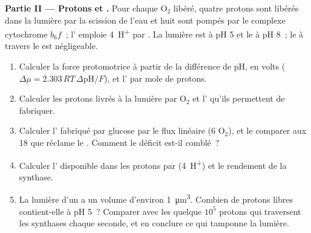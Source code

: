 \begin{problem}
\medskip
\noindent\textbf{Partie II --- Protons et .}
Pour chaque $\mathrm{O_2}$ libéré, quatre protons sont libérés dans la
lumière par la scission de l'eau et huit sont pompés par le complexe
cytochrome $b_6f$~; l' emploie \qty{4}{H^+} par . La
lumière est à pH 5 et le  à pH 8~; le  à
travers le  est négligeable.
\begin{enumerate}[resume]
  \item Calculer la force protomotrice à partir de la différence de pH,
        en volts ($\Delta\mu = 2.303\,RT\,\Delta\mathrm{pH}/F$), et
        l' par mole de protons.
  \item Calculer les protons livrés à la lumière par $\mathrm{O_2}$ et
        l' qu'ils permettent de fabriquer.
  \item Calculer l' fabriqué par glucose par le flux linéaire (6
        $\mathrm{O_2}$), et le comparer aux 18 que réclame le . Comment le déficit est-il comblé~?
  \item Calculer l' disponible dans les protons par 
        (\qty{4}{H^+}) et le rendement de la synthase.
  \item La lumière d'un  a un volume d'environ
        \qty{1}{\micro m^3}. Combien de protons libres contient-elle à
        pH 5~? Comparer avec les quelque $10^5$ protons qui traversent
        les synthases chaque seconde, et en conclure ce qui tamponne la
        lumière.
\end{enumerate}


\end{problem}
